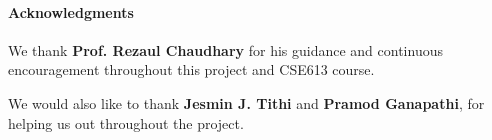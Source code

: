 \paragraph{Acknowledgments}
\label{ack}

%
%
%
%
%

We thank \textbf{Prof. Rezaul Chaudhary} for his guidance and continuous
encouragement throughout this project and CSE613 course.

We would also like to thank \textbf{Jesmin J. Tithi} and \textbf{Pramod Ganapathi},
for helping us out throughout the project.



